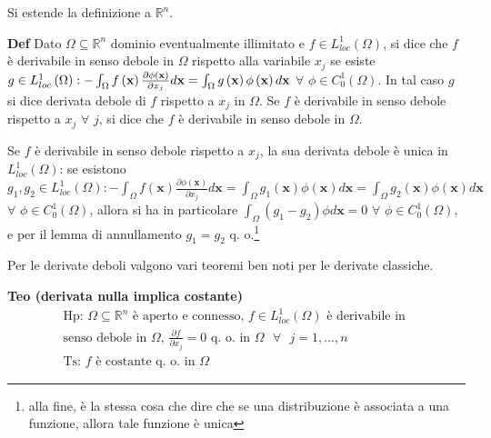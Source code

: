 \documentclass{article}
\begin{document}
Si estende la definizione a $%
\mathbb{R}
^{n}$.

\textbf{Def} Dato $\Omega \subseteq 
\mathbb{R}
^{n}$ dominio eventualmente illimitato e $f\in L_{loc}^{1}\left( \Omega
\right) $, si dice che $f$ \`{e} derivabile in senso debole in $\Omega $
rispetto alla variabile $x_{j}$ se esiste $g\in L_{loc}^{1}\left( \Omega
\right) :-\int_{\Omega }f\left( \mathbf{x}\right) \frac{\partial \phi \left( 
\mathbf{x}\right) }{\partial x_{j}}d\mathbf{x}=\int_{\Omega }g\left( \mathbf{%
x}\right) \phi \left( \mathbf{x}\right) d\mathbf{x}$ $\forall $ $\phi \in
C_{0}^{1}\left( \Omega \right) $. In tal caso $g$ si dice derivata debole di 
$f$ rispetto a $x_{j}$ in $\Omega $. Se $f$ \`{e} derivabile in senso debole
rispetto a $x_{j}$ $\forall $ $j$, si dice che $f$ \`{e} derivabile in senso
debole in $\Omega $.

Se $f$ \`{e} derivabile in senso debole rispetto a $x_{j}$, la sua derivata
debole \`{e} unica in $L_{loc}^{1}\left( \Omega \right) $: se esistono $%
g_{1},g_{2}\in L_{loc}^{1}\left( \Omega \right) :-\int_{\Omega }f\left( 
\mathbf{x}\right) \frac{\partial \phi \left( \mathbf{x}\right) }{\partial
x_{j}}d\mathbf{x}=\int_{\Omega }g_{1}\left( \mathbf{x}\right) \phi \left( 
\mathbf{x}\right) d\mathbf{x=}\int_{\Omega }g_{2}\left( \mathbf{x}\right)
\phi \left( \mathbf{x}\right) d\mathbf{x}$ $\forall $ $\phi \in
C_{0}^{1}\left( \Omega \right) $, allora si ha in particolare $\int_{\Omega
}\left( g_{1}-g_{2}\right) \phi d\mathbf{x}=0$ $\forall $ $\phi \in
C_{0}^{1}\left( \Omega \right) $, e per il lemma di annullamento $%
g_{1}=g_{2} $ q. o.\footnote{%
alla fine, \`{e} la stessa cosa che dire che se una distribuzione \`{e}
associata a una funzione, allora tale funzione \`{e} unica}

Per le derivate deboli valgono vari teoremi ben noti per le derivate
classiche.

\textbf{Teo (derivata nulla implica costante)}%
\begin{gather*}
\text{Hp: }\Omega \subseteq 
\mathbb{R}
^{n}\text{ \`{e} aperto e connesso, }f\in L_{loc}^{1}\left( \Omega \right) 
\text{ \`{e} derivabile in } \\
\text{senso debole in }\Omega \text{, }\frac{\partial f}{\partial x_{j}}=0%
\text{ q. o. in }\Omega \text{ }\forall \text{ }j=1,...,n \\
\text{Ts: }f\text{ \`{e} costante q. o. in }\Omega
\end{gather*}
\end{document}
